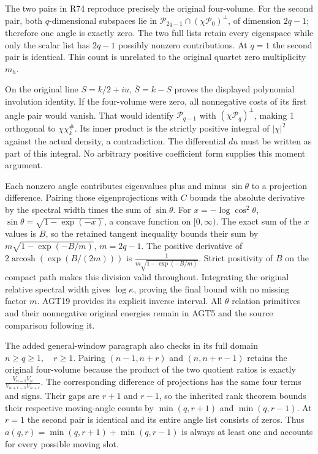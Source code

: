 The two pairs in R74 reproduce precisely the original four-volume. For
the second pair, both \(q\)-dimensional subspaces lie in
\(\mathcal P_{2q-1}\cap(\chi\mathcal P_0)^\perp\), of dimension
\(2q-1\); therefore one angle is exactly zero. The two full lists retain
every eigenspace while only the scalar list has \(2q-1\) possibly
nonzero contributions. At \(q=1\) the second pair is identical. This
count is unrelated to the original quartet zero multiplicity \(m_h\).

On the original line \(S=k/2+iu\), \(\overline S=k-S\) proves the
displayed polynomial involution identity. If the four-volume were zero,
all nonnegative costs of its first angle pair would vanish. That would
identify \(\mathcal P_{q-1}\) with \((\chi\mathcal P_q)^\perp\), making
1 orthogonal to \(\chi\chi_k^\#\). Its inner product is the strictly
positive integral of \(|\chi|^2\) against the actual density, a
contradiction. The differential \(du\) must be written as part of this
integral. No arbitrary positive coefficient form supplies this moment
argument.

Each nonzero angle contributes eigenvalues plus and minus \(\sin\theta\)
to a projection difference. Pairing those eigenprojections with \(C\)
bounds the absolute derivative by the spectral width times the sum of
\(\sin\theta\). For \(x=-\log\cos^2\theta\),
\(\sin\theta=\sqrt{1-\exp(-x)}\), a concave function on \([0,\infty)\).
The exact sum of the \(x\) values is \(B\), so the retained tangent
inequality bounds their sum by \(m\sqrt{1-\exp(-B/m)}\), \(m=2q-1\). The
positive derivative of \(2\operatorname{arcosh}(\exp(B/(2m)))\) is
\(\frac1{m\sqrt{1-\exp(-B/m)}}\). Strict positivity of \(B\) on the
compact path makes this division valid throughout. Integrating the
original relative spectral width gives \(\log\kappa\), proving the final
bound with no missing factor \(m\). AGT19 provides its explicit inverse
interval. All \(\theta\) relation primitives and their nonnegative
original energies remain in AGT5 and the source comparison following it.

The added general-window paragraph also checks in its full domain
\(n\geq q\geq1,\quad r\geq1\). Pairing \((n-1,n+r)\) and \((n,n+r-1)\)
retains the original four-volume because the product of the two quotient
ratios is exactly \(\frac{V_{n-1}V_n}{V_{n+r-1}V_{n+r}}\). The
corresponding difference of projections has the same four terms and
signs. Their gaps are \(r+1\) and \(r-1\), so the inherited rank theorem
bounds their respective moving-angle counts by \(\min(q,r+1)\) and
\(\min(q,r-1)\). At \(r=1\) the second pair is identical and its entire
angle list consists of zeros. Thus \(a(q,r)=\min(q,r+1)+\min(q,r-1)\) is
always at least one and accounts for every possible moving slot.

